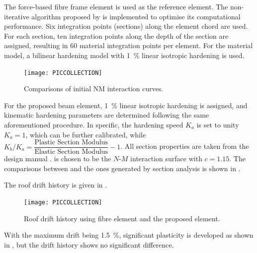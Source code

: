 The force-based fibre frame element \citep{Spacone1996} is used as the reference element.
The non-iterative algorithm proposed by \citet{Neuenhofer:Filippou:97:Evaluation} is implemented to optimise its computational performance.
Six integration points (sections) along the element chord are used.
For each section, ten integration points along the depth of the section are assigned, resulting in \num{60} material integration points per element.
For the material model, a bilinear hardening model with \SI{1}{\percent} linear isotropic hardening is used.

\begin{figure}[htb]
\centering\footnotesize
\texttt{[image: PICCOLLECTION]}
\caption{Comparisons of initial NM interaction curves.}\label{fig:nm_surface_example}
\end{figure}
For the proposed beam element, \SI{1}{\percent} linear isotropic hardening is assigned, and kinematic hardening parameters are determined following the same aforementioned procedure. In specific, the hardening speed $K_a$ is set to unity $K_a=1$, which can be further calibrated, while $K_b/K_a=\dfrac{\text{Plastic Section Modulus}}{\text{Elastic Section Modulus}}-1$.
All section properties are taken from the design manual \citep{AISC2017}.  is chosen to be the $N$-$M$ interaction surface with $c=1.15$. The comparisons between  and the ones generated by section analysis is shown in .

The roof drift history is given in .
\begin{figure}[htb]
\centering\footnotesize
\texttt{[image: PICCOLLECTION]}
\caption{Roof drift history using fibre element and the proposed element.}\label{fig:nm_frame_example}
\end{figure}
With the maximum drift being \SI{1.5}{\percent}, significant plasticity is developed as shown in , but the drift history shows no significant difference.

